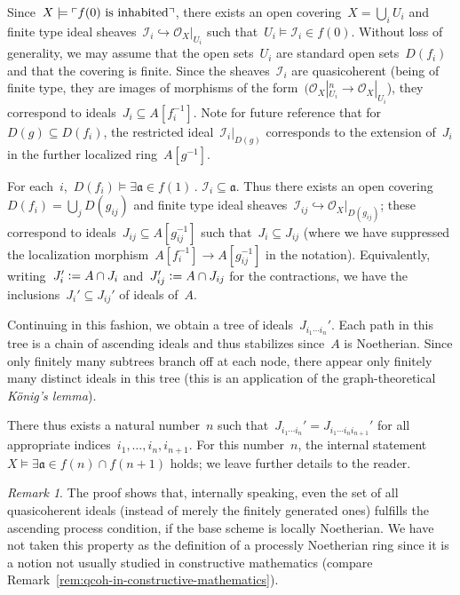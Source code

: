 \documentclass[10pt,reqno,a4paper]{amsbook}
\makeatletter
\theoremstyle{definition}
\theoremstyle{plain}
\theoremstyle{remark}
\newtheorem{rem}[defn]{Remark}
\renewcommand{\O}{\mathcal{O}}
\newcommand{\I}{\mathcal{I}}
\newcommand{\aaa}{\mathfrak{a}}
\newcommand{\?}{\,{:}\,}
\renewcommand{\_}{\mathpunct{.}\,}
\newcommand{\speak}[1]{\ulcorner\text{\textnormal{#1}}\urcorner}
\newcommand{\defeq}{\vcentcolon=}
\renewenvironment{proof}[1][\proofname]{\par
  \pushQED{\qed}%
  \normalfont \topsep6\p@\@plus6\p@\relax
  \trivlist
  \item[\hskip\labelsep
        \itshape
    #1\@addpunct{.}]\ignorespaces
}{%
  \popQED\endtrivlist\@endpefalse
}
\makeatother
\begin{document}
{\begin{proof}
Since~$X \models \speak{$f(0)$ is inhabited}$, there exists an open covering~$X
= \bigcup_i U_i$ and finite type ideal sheaves~$\I_i \hookrightarrow
\O_X|_{U_i}$ such that~$U_i \models \I_i \in f(0)$. Without loss of generality,
we may assume that the open sets~$U_i$ are standard open sets~$D(f_i)$ and that
the covering is finite. Since the sheaves~$\I_i$ are quasicoherent (being of
finite type, they are images of morphisms of the form~$(\O_X|_{U_i}^n \to
\O_X|_{U_i}$), they correspond to ideals~$J_i \subseteq A[f_i^{-1}]$. Note for future reference
that for~$D(g) \subseteq D(f_i)$, the restricted ideal~$\I_i|_{D(g)}$ corresponds to the extension of~$J_i$ in the further
localized ring~$A[g^{-1}]$.

For each~$i$,~$D(f_i) \models \exists \aaa \in f(1)\_ \I_i \subseteq \aaa$.
Thus there exists an open covering~$D(f_i) = \bigcup_j D(g_{ij})$ and finite
type ideal sheaves~$\I_{ij} \hookrightarrow \O_X|_{D(g_{ij})}$; these
correspond to ideals~$J_{ij} \subseteq A[g_{ij}^{-1}]$ such that~$J_i
\subseteq J_{ij}$ (where we have suppressed the localization
morphism~$A[f_i^{-1}] \to A[g_{ij}^{-1}]$ in the notation). Equivalently,
writing~$J_i' \defeq A \cap J_i$ and~$J_{ij}' \defeq A \cap J_{ij}$ for the
contractions, we have the inclusions~$J_i' \subseteq J_{ij}'$ of ideals of~$A$.

Continuing in this fashion, we obtain a tree of ideals~$J_{i_1 \cdots i_n}'$.
Each path in this tree is a chain of ascending ideals and thus stabilizes
since~$A$ is Noetherian. Since only finitely many subtrees branch off at
each node, there appear only finitely many distinct ideals in this tree (this
is an application of the graph-theoretical \emph{König's lemma}).

There thus exists a natural number~$n$ such that~$J_{i_1 \cdots i_n}' = J_{i_1
\cdots i_n i_{n+1}}'$ for all appropriate indices~$i_1,\ldots,i_n,i_{n+1}$.
For this number~$n$, the internal statement~$X \models \exists \aaa \in f(n)
\cap f(n+1)$ holds; we leave further details to the reader.
\end{proof}

\begin{rem}The proof shows that, internally speaking, even
the set of all quasicoherent ideals (instead of merely the finitely generated
ones) fulfills the ascending process condition, if the base scheme is locally Noetherian. We have not taken this property
as the definition of a processly Noetherian ring since it is a notion not
usually studied in constructive mathematics (compare
Remark~\ref{rem:qcoh-in-constructive-mathematics}).
\end{rem}

}
\end{document}
